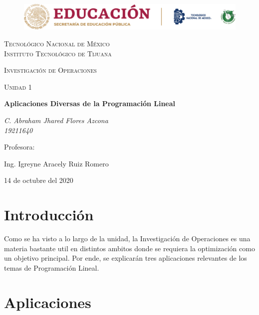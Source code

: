 \documentclass[letterpaper, 12pt]{article}
\begin{document}
    
    \begin{titlepage}
        \begin{figure}[ht]
            \centering
            \includegraphics[width=15cm]{logosITT.png}
        \end{figure}
        \centering
        {\scshape\LARGE Tecnológico Nacional de México\\Instituto Tecnológico de Tijuana\par}
        \vspace{1cm}
        {\scshape\Large Investigación de Operaciones\par}
        \vspace{1cm}
        {\scshape\Large Unidad 1\par}
        \vspace{1.5cm}
        {\huge\bfseries Aplicaciones Diversas de la Programación Lineal\par}
        \vspace{2cm}
        {\Large\itshape C. Abraham Jhared Flores Azcona\\19211640\par}
        \vfill
        Profesora: \par
        Ing. Igreyne Aracely Ruiz Romero
        
        \vfill

        {\large 14 de octubre del 2020}
    \end{titlepage}

    \newpage
    \thispagestyle{empty}
    \tableofcontents

    \newpage
    \section{Introducción}
    Como se ha visto a lo largo de la unidad, la Investigación de Operaciones es una materia bastante util en distintos ambitos donde se requiera la optimización
    como un objetivo principal. Por ende, se explicarán tres aplicaciones relevantes de los temas de Programación Lineal. 
    \section{Aplicaciones}
\end{document}
